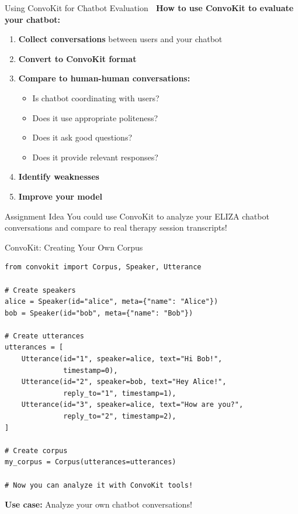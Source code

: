 \documentclass[aspectratio=169]{beamer}
\begin{document}
\begin{frame}[shrink=10]{Using ConvoKit for Chatbot Evaluation 🤖}
    \textbf{How to use ConvoKit to evaluate your chatbot:}

    \vspace{0.3cm}

    \begin{enumerate}\setlength{\itemsep}{0pt}
        \item \textbf{Collect conversations} between users and your chatbot
        \item \textbf{Convert to ConvoKit format}
        \item \textbf{Compare to human-human conversations:}
        \begin{itemize}\setlength{\itemsep}{0pt}
            \item Is chatbot coordinating with users?
            \item Does it use appropriate politeness?
            \item Does it ask good questions?
            \item Does it provide relevant responses?
        \end{itemize}
        \item \textbf{Identify weaknesses}
        \item \textbf{Improve your model}
    \end{enumerate}

    \vspace{0.3cm}

    \begin{alertblock}{Assignment Idea}
        You could use ConvoKit to analyze your ELIZA chatbot conversations and compare to real therapy session transcripts!
    \end{alertblock}
\end{frame}

\begin{frame}[fragile]{ConvoKit: Creating Your Own Corpus 📝}
    \begin{lstlisting}
from convokit import Corpus, Speaker, Utterance

# Create speakers
alice = Speaker(id="alice", meta={"name": "Alice"})
bob = Speaker(id="bob", meta={"name": "Bob"})

# Create utterances
utterances = [
    Utterance(id="1", speaker=alice, text="Hi Bob!",
              timestamp=0),
    Utterance(id="2", speaker=bob, text="Hey Alice!",
              reply_to="1", timestamp=1),
    Utterance(id="3", speaker=alice, text="How are you?",
              reply_to="2", timestamp=2),
]

# Create corpus
my_corpus = Corpus(utterances=utterances)

# Now you can analyze it with ConvoKit tools!
    \end{lstlisting}

    \vspace{0.3cm}

    \textbf{Use case:} Analyze your own chatbot conversations!
\end{frame}
\end{document}
